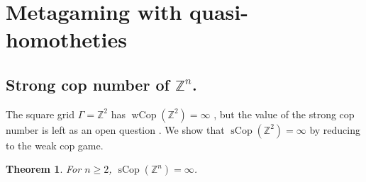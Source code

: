 \documentclass{amsart}
\newtheorem{theorem}{Theorem}[section]
\theoremstyle{definition}
\theoremstyle{remark}
\theoremstyle{remark}
\theoremstyle{definition}
\newcommand{\sCop}{\operatorname{sCop}}
\newcommand{\wCop}{\operatorname{wCop}}
\renewcommand{\geq}{\geqslant}
\begin{document}
\section{Metagaming with quasi-homotheties}\label{sec:meta}
\subsection{Strong cop number of $\mathbb{Z}^n$.}

The square grid $\Gamma = \mathbb{Z}^2$ has $\wCop(\mathbb{Z}^2) = \infty$ \cite[Theorem C]{LMR23}, but the value of the strong cop number is left as an open question \cite[Question D]{LMR23}. We show that $\sCop(\mathbb{Z}^2)=\infty$ by reducing to the weak cop game.


\begin{theorem}\label{thm:scop-Zn}
 For $n \geq 2$, $\sCop (\mathbb{Z}^n) = \infty$.
\end{theorem}
\end{document}
